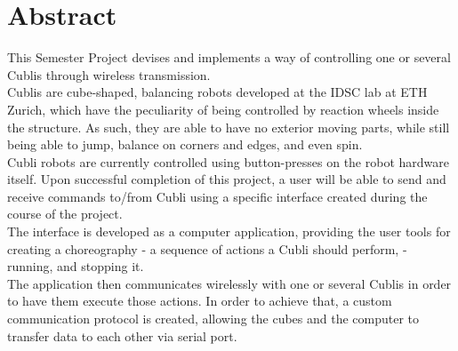 




 \setcounter{tocdepth}{2}
 \tableofcontents

 \cleardoublepage


\chapter*{Abstract}

This Semester Project devises and implements a way of controlling one or several Cublis through wireless transmission.\\ 

Cublis are cube-shaped, balancing robots developed at the IDSC lab at ETH Zurich, which have the peculiarity of being controlled by reaction wheels inside the structure. As such, they are able to have no exterior moving parts, while still being able to jump, balance on corners and edges, and even spin.\\ 

Cubli robots are currently controlled using button-presses on the robot hardware itself. Upon successful completion of this project, a user will be able to send and receive commands to/from Cubli using a specific interface created during the course of the project.\\

The interface is developed as a computer application, providing the user tools for creating a choreography - a sequence of actions a Cubli should perform, - running, and stopping it.\\ 

The application then communicates wirelessly with one or several Cublis in order to have them execute those actions. In order to achieve that, a custom communication protocol is created, allowing the cubes and the computer to transfer data to each other via serial port.\\ 

